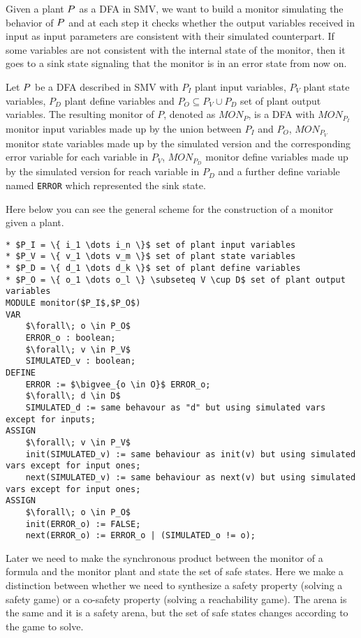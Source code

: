 Given a plant $P$ as a DFA in SMV, we want to build a monitor simulating the behavior of $P$ and at each step it checks whether the output variables received in input as input parameters are consistent with their simulated counterpart. 
If some variables are not consistent with the internal state of the monitor, then it goes to a sink state signaling that the monitor is in an error state from now on.

\begin{definition}
Let $P$ be a DFA described in SMV with $P_I$ plant input variables, $P_V$ plant state variables, $P_D$ plant define variables and $P_O \subseteq P_V \cup P_D$ set of plant output variables.
The resulting monitor of $P$, denoted as $MON_P$, is a DFA with $MON_{P_I}$ monitor input variables made up by the union between $P_I$ and $P_O$, $MON_{P_V}$ monitor state variables made up by the simulated version and the corresponding error variable for each variable in $P_V$, $MON_{P_D}$ monitor define variables made up by the simulated version for reach variable in $P_D$ and a further define variable named \lstinline{ERROR} which represented the sink state.
\end{definition}

Here below you can see the general scheme for the construction of a monitor given a plant.
\begin{lstlisting}[language=smv, mathescape=true,  caption=Reduction to synthesis problem: plant monitor construction scheme, label={lst:monitor-construction}]
* $P_I = \{ i_1 \dots i_n \}$ set of plant input variables
* $P_V = \{ v_1 \dots v_m \}$ set of plant state variables
* $P_D = \{ d_1 \dots d_k \}$ set of plant define variables
* $P_O = \{ o_1 \dots o_l \} \subseteq V \cup D$ set of plant output variables
MODULE monitor($P_I$,$P_O$)
VAR
    $\forall\; o \in P_O$
    ERROR_o : boolean;
    $\forall\; v \in P_V$
    SIMULATED_v : boolean;
DEFINE
    ERROR := $\bigvee_{o \in O}$ ERROR_o;
    $\forall\; d \in D$
    SIMULATED_d := same behavour as "d" but using simulated vars except for inputs;
ASSIGN
    $\forall\; v \in P_V$
    init(SIMULATED_v) := same behaviour as init(v) but using simulated vars except for input ones; 
    next(SIMULATED_v) := same behaviour as next(v) but using simulated vars except for input ones;
ASSIGN
    $\forall\; o \in P_O$
    init(ERROR_o) := FALSE;
    next(ERROR_o) := ERROR_o | (SIMULATED_o != o);
\end{lstlisting}

Later we need to make the synchronous product between the monitor of a formula and the monitor plant and state the set of safe states.
Here we make a distinction between whether we need to synthesize a safety property (solving a safety game) or a co-safety property (solving a reachability game).
The arena is the same and it is a safety arena, but the set of safe states changes according to the game to solve.

